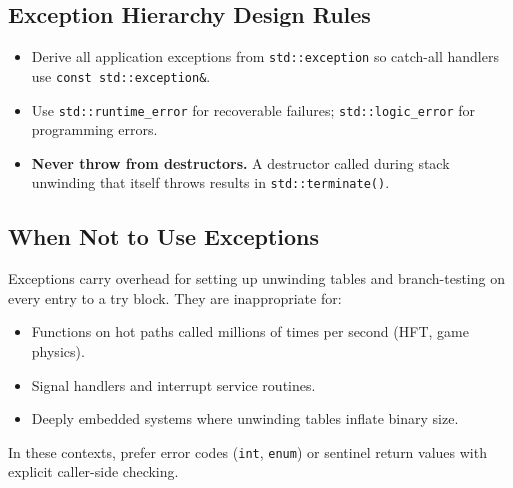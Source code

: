 \subsection{Exception Hierarchy Design Rules}

\begin{itemize}
    \item Derive all application exceptions from \texttt{std::exception} so catch-all handlers use \texttt{const std::exception\&}.
    \item Use \texttt{std::runtime\_error} for recoverable failures; \texttt{std::logic\_error} for programming errors.
    \item \textbf{Never throw from destructors.} A destructor called during stack unwinding that itself throws results in \texttt{std::terminate()}.
\end{itemize}

\subsection{When Not to Use Exceptions}

Exceptions carry overhead for setting up unwinding tables and branch-testing on every entry to a try block. They are inappropriate for:
\begin{itemize}
    \item Functions on hot paths called millions of times per second (HFT, game physics).
    \item Signal handlers and interrupt service routines.
    \item Deeply embedded systems where unwinding tables inflate binary size.
\end{itemize}

In these contexts, prefer error codes (\texttt{int}, \texttt{enum}) or sentinel return values with explicit caller-side checking.
